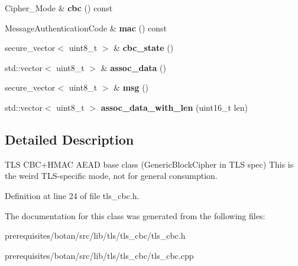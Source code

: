 \begin{DoxyCompactItemize}
\item 
\mbox{\label{class_botan_1_1_t_l_s_1_1_t_l_s___c_b_c___h_m_a_c___a_e_a_d___mode_aae98af15e630ce5c70a61ca29f2e1fad}} 
Cipher\+\_\+\+Mode \& {\bfseries cbc} () const
\item 
\mbox{\label{class_botan_1_1_t_l_s_1_1_t_l_s___c_b_c___h_m_a_c___a_e_a_d___mode_aec5ffd5693b8eefa2a9448e10723b871}} 
Message\+Authentication\+Code \& {\bfseries mac} () const
\item 
\mbox{\label{class_botan_1_1_t_l_s_1_1_t_l_s___c_b_c___h_m_a_c___a_e_a_d___mode_a0280927446c43cb8f5bb7c230ac0a0e5}} 
secure\+\_\+vector$<$ uint8\+\_\+t $>$ \& {\bfseries cbc\+\_\+state} ()
\item 
\mbox{\label{class_botan_1_1_t_l_s_1_1_t_l_s___c_b_c___h_m_a_c___a_e_a_d___mode_a0487a0a4939f4bccbd3a32bdf40f0a6f}} 
std\+::vector$<$ uint8\+\_\+t $>$ \& {\bfseries assoc\+\_\+data} ()
\item 
\mbox{\label{class_botan_1_1_t_l_s_1_1_t_l_s___c_b_c___h_m_a_c___a_e_a_d___mode_ac770e823d96250dc93d94f1c45631cec}} 
secure\+\_\+vector$<$ uint8\+\_\+t $>$ \& {\bfseries msg} ()
\item 
\mbox{\label{class_botan_1_1_t_l_s_1_1_t_l_s___c_b_c___h_m_a_c___a_e_a_d___mode_a44d6177fb10409671ba4c17b424431ac}} 
std\+::vector$<$ uint8\+\_\+t $>$ {\bfseries assoc\+\_\+data\+\_\+with\+\_\+len} (uint16\+\_\+t len)
\end{DoxyCompactItemize}


\subsection{Detailed Description}
T\+LS C\+B\+C+\+H\+M\+AC A\+E\+AD base class (Generic\+Block\+Cipher in T\+LS spec) This is the weird T\+L\+S-\/specific mode, not for general consumption. 

Definition at line 24 of file tls\+\_\+cbc.\+h.



The documentation for this class was generated from the following files\+:\begin{DoxyCompactItemize}
\item 
prerequisites/botan/src/lib/tls/tls\+\_\+cbc/tls\+\_\+cbc.\+h\item 
prerequisites/botan/src/lib/tls/tls\+\_\+cbc/tls\+\_\+cbc.\+cpp\end{DoxyCompactItemize}
